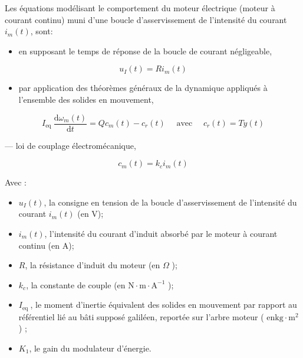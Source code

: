 \documentclass[10pt]{article}
\begin{document}
Les équations modélisant le comportement du moteur électrique (moteur à courant continu) muni d'une boucle d'asservissement de l'intensité du courant $i_{m}(t)$, sont:

\begin{itemize}
  \item en supposant le temps de réponse de la boucle de courant négligeable,
\end{itemize}

$$
u_{I}(t)=R i_{m}(t)
$$

\begin{itemize}
  \item par application des théorèmes généraux de la dynamique appliqués à l'ensemble des solides en mouvement,
\end{itemize}

$$
I_{\text {eq }} \frac{\mathrm{d} \omega_{m}(t)}{\mathrm{d} t}=Q c_{m}(t)-c_{r}(t) \quad \text { avec } \quad c_{r}(t)=T y(t)
$$

— loi de couplage électromécanique,

$$
c_{m}(t)=k_{c} i_{m}(t)
$$

Avec :

\begin{itemize}
  \item $u_{I}(t)$, la consigne en tension de la boucle d'asservissement de l'intensité du courant $i_{m}(t)$ (en V);

  \item $i_{m}(t)$, l'intensité du courant d'induit absorbé par le moteur à courant continu (en A);

  \item $R$, la résistance d'induit du moteur (en $\Omega$ );

  \item $k_{c}$, la constante de couple (en $\mathrm{N} \cdot \mathrm{m} \cdot \mathrm{A}^{-1}$ );

  \item $I_{\text {eq }}$, le moment d'inertie équivalent des solides en mouvement par rapport au référentiel lié au bâti supposé galiléen, reportée sur l'arbre moteur ( $\mathrm{en} \mathrm{kg} \cdot \mathrm{m}^{2}$ ) ;

  \item $K_{1}$, le gain du modulateur d'énergie.

\end{itemize}
\end{document}
